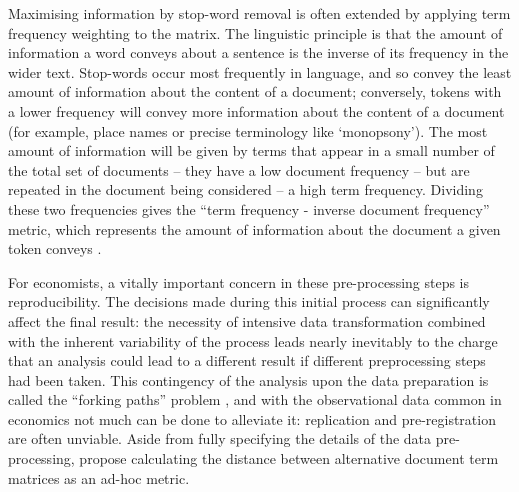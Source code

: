 \documentclass[12pt,a4]{article}
\begin{document}
Maximising information by stop-word removal is often extended by applying term frequency weighting to the matrix. The linguistic principle is that the amount of information a word conveys about a sentence is the inverse of its frequency in the wider text. Stop-words occur most frequently in language, and so convey the least amount of information about the content of a document; conversely, tokens with a lower frequency will convey more information about the content of a document (for example, place names or precise terminology like `monopsony'). The most amount of information will be given by terms that appear in a small number of the total set of documents -- they have a low document frequency -- but are repeated in the document being considered -- a high term frequency. Dividing these two frequencies gives the ``term frequency - inverse document frequency'' metric, which represents the amount of information about the document a given token conveys \parencite[100]{manningIntroductionInformationRetrieval2008}.

For economists, a vitally important concern in these pre-processing steps is reproducibility. The decisions made during this initial process can significantly affect the final result: the necessity of intensive data transformation combined with the inherent variability of the process leads nearly inevitably to the charge that an analysis could lead to a different result if different preprocessing steps had been taken. This contingency of the analysis upon the data preparation is called the ``forking paths'' problem \parencite{gelmanStatisticalCrisisScience2014}, and with the observational data common in economics not much can be done to alleviate it: replication and pre-registration are often unviable. Aside from fully specifying the details of the data pre-processing, \textcite{dennyTextPreprocessingUnsupervised2018} propose calculating the distance between alternative document term matrices as an ad-hoc metric.
\end{document}
